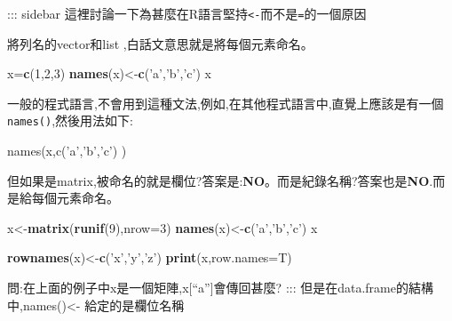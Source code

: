 \documentclass[]{book}
\newenvironment{Shaded}{\begin{snugshade}}{\end{snugshade}}
\newcommand{\KeywordTok}[1]{\textcolor[rgb]{0.13,0.29,0.53}{\textbf{#1}}}
\newcommand{\DataTypeTok}[1]{\textcolor[rgb]{0.13,0.29,0.53}{#1}}
\newcommand{\DecValTok}[1]{\textcolor[rgb]{0.00,0.00,0.81}{#1}}
\newcommand{\CharTok}[1]{\textcolor[rgb]{0.31,0.60,0.02}{#1}}
\newcommand{\StringTok}[1]{\textcolor[rgb]{0.31,0.60,0.02}{#1}}
\newcommand{\NormalTok}[1]{#1}
\theoremstyle{definition}
\theoremstyle{definition}
\theoremstyle{definition}
\theoremstyle{remark}
\begin{document}
::: sidebar
這裡討論一下為甚麼在R語言堅持\texttt{\textless{}-}而不是\texttt{=}的一個原因

將列名的vector和list ,白話文意思就是將每個元素命名。

\begin{Shaded}
\begin{Highlighting}[]
\NormalTok{x=}\KeywordTok{c}\NormalTok{(}\DecValTok{1}\NormalTok{,}\DecValTok{2}\NormalTok{,}\DecValTok{3}\NormalTok{)}
\KeywordTok{names}\NormalTok{(x)<-}\KeywordTok{c}\NormalTok{(}\StringTok{'a'}\NormalTok{,}\StringTok{'b'}\NormalTok{,}\StringTok{'c'}\NormalTok{)}
\NormalTok{x}
\end{Highlighting}
\end{Shaded}

一般的程式語言,不會用到這種文法,例如,在其他程式語言中,直覺上應該是有一個\texttt{names()},然後用法如下:

\begin{Shaded}
\begin{Highlighting}[]
\NormalTok{names(x,c(}\CharTok{'a'}\NormalTok{,}\CharTok{'b'}\NormalTok{,}\CharTok{'c'}\NormalTok{) )}
\end{Highlighting}
\end{Shaded}

但如果是matrix,被命名的就是欄位?答案是:\textbf{NO}。而是紀錄名稱?答案也是\textbf{NO}.而是給每個元素命名。

\begin{Shaded}
\begin{Highlighting}[]
\NormalTok{x<-}\KeywordTok{matrix}\NormalTok{(}\KeywordTok{runif}\NormalTok{(}\DecValTok{9}\NormalTok{),}\DataTypeTok{nrow=}\DecValTok{3}\NormalTok{)}
\KeywordTok{names}\NormalTok{(x)<-}\KeywordTok{c}\NormalTok{(}\StringTok{'a'}\NormalTok{,}\StringTok{'b'}\NormalTok{,}\StringTok{'c'}\NormalTok{)}
\NormalTok{x}
\end{Highlighting}
\end{Shaded}

\begin{Shaded}
\begin{Highlighting}[]
\KeywordTok{rownames}\NormalTok{(x)<-}\KeywordTok{c}\NormalTok{(}\StringTok{'x'}\NormalTok{,}\StringTok{'y'}\NormalTok{,}\StringTok{'z'}\NormalTok{)}
\KeywordTok{print}\NormalTok{(x,}\DataTypeTok{row.names=}\NormalTok{T)}
\end{Highlighting}
\end{Shaded}

問:在上面的例子中x是一個矩陣,x{[}``a''{]}會傳回甚麼? :::
但是在data.frame的結構中,names()\textless{}- 給定的是欄位名稱
\end{document}

